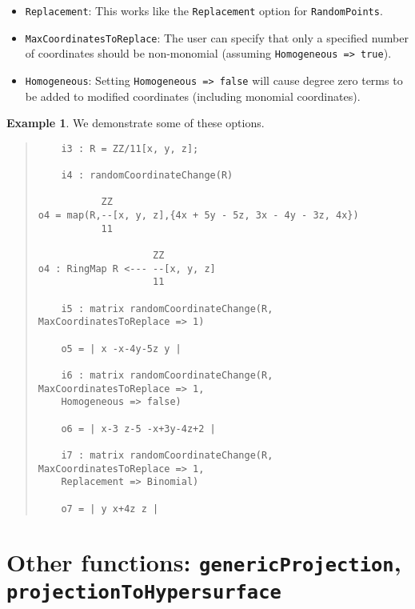 \documentclass[11pt]{amsart}
\theoremstyle{definition}
\newtheorem{example}{Example}[section]
\begin{document}
\begin{itemize}
\item {\tt Replacement}: This works like the {\tt Replacement} option for {\tt RandomPoints}.
\item {\tt MaxCoordinatesToReplace}: The user can specify that only a specified number of coordinates should be non-monomial (assuming {\tt Homogeneous => true}).  
\item {\tt Homogeneous}:  Setting {\tt Homogeneous => false} will cause degree zero terms to be added to modified coordinates (including monomial coordinates).		
\end{itemize} 
\begin{example}  We demonstrate some of these options.
%
  {{\small\color{blue}
  \begin{quote}
\begin{verbatim}
	i3 : R = ZZ/11[x, y, z];
	
	i4 : randomCoordinateChange(R)
	
           ZZ
o4 = map(R,--[x, y, z],{4x + 5y - 5z, 3x - 4y - 3z, 4x})                     
           11
           
                    ZZ
o4 : RingMap R <--- --[x, y, z]
                    11
                    
	i5 : matrix randomCoordinateChange(R, MaxCoordinatesToReplace => 1)
	
	o5 = | x -x-4y-5z y |
	
	i6 : matrix randomCoordinateChange(R, MaxCoordinatesToReplace => 1, 
	Homogeneous => false)
	
	o6 = | x-3 z-5 -x+3y-4z+2 |
	
	i7 : matrix randomCoordinateChange(R, MaxCoordinatesToReplace => 1, 
	Replacement => Binomial)
	
	o7 = | y x+4z z |
\end{verbatim}
\end{quote}
    }}
  
\end{example}


\section{Other functions: {\tt genericProjection}, {\tt projectionToHypersurface}}\label{projectionfunctions}
\end{document}
